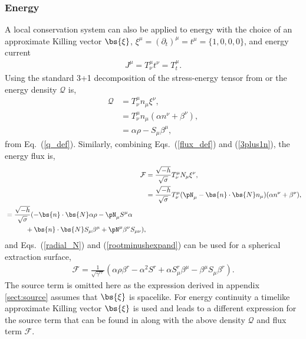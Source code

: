 \subsubsection{Energy} \label{sect:energy}
A local conservation system can also be applied to energy with the choice of an approximate Killing vector $\bs{\xi}$, $\xi^\mu = (\partial_t)^\mu = t^\mu =\{1,0,0,0\}$, and energy current
\begin{align}
\label{energycurrent} J^\mu = T^\mu_\nu t^\nu = T^\mu_t.
\end{align}
 Using the standard 3+1 decomposition of the stress-energy tensor from \cite{gourgoulhon20073+} or \cite{alcubierre2008introduction} the energy density $\mathcal{Q}$ is,
\begin{align}
\mathcal{Q} &= T^\mu_\nu n_\mu \xi^\nu, \\
            &= T^\mu_\nu n_\mu (\alpha n^\nu+ \beta^\nu), \\
            &= \alpha \rho - S_\mu \beta^\mu,
\end{align}
from Eq.~(\ref{q_def}). Similarly, combining Eqs.~(\ref{flux_def}) and (\ref{3plus1n}), the energy flux is,
\begin{align}\mathcal{F} &= \frac{\sqrt{-h}}{\sqrt{\sigma}}T^\mu_\nu N_\mu \xi^\nu, \\
            &= \frac{\sqrt{-h}}{\sqrt{\sigma}}T^\mu_\nu (\pN_\mu - \bs{n}\cdot \bs{N} n_\mu) (\alpha n^\nu + \beta^\nu), \\
    \begin{split} &= \frac{\sqrt{-h}}{\sqrt{\sigma}}(-\bs{n}\cdot \bs{N}\alpha\rho -  \pN_\mu S^\mu \alpha \\&\quad\quad\quad+ \bs{n}\cdot \bs{N} S_\mu \beta^\mu + \pN^\mu \beta^\nu S_{\mu\nu}), \end{split}
\end{align} 
and Eqs.~(\ref{radial_N}) and (\ref{rootminushexpand}) can be used for a spherical extraction surface,
\begin{align} 
 \mathcal{F} = \frac{1}{\sqrt{\gamma^{rr}}}(\alpha \rho \beta^r - \alpha^2 S^r   +  \alpha S^r_\mu\beta^\mu - \beta^\mu S_\mu \beta^r ). 
\end{align} 
 The source term is omitted here as the expression derived in appendix \ref{sect:source} assumes that $\bs{\xi}$ is spacelike. For energy continuity a timelike approximate Killing vector $\bs{\xi}$ is used and leads to a different expression for the source term that can be found in \cite{clough2021continuity} along with the above density $\mathcal{Q}$ and flux term $\mathcal{F}$. 


